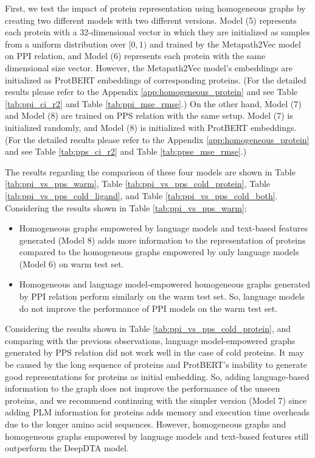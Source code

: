 First, we test the impact of protein representation using homogeneous graphs by creating two different models with two different versions. Model (5) represents each protein with a 32-dimensional vector in which they are initialized as samples from a uniform distribution over $[0, 1)$ and trained by the Metapath2Vec model on PPI relation, and Model (6) represents each protein with the same dimensional size vector. However, the Metapath2Vec model's embeddings are initialized as ProtBERT embeddings of corresponding proteins. (For the detailed results please refer to the Appendix \ref{app:homogeneous_protein} and see Table \ref{tab:ppi_ci_r2} and Table \ref{tab:ppi_mse_rmse}.) On the other hand, Model (7) and Model (8) are trained on PPS relation with the same setup. Model (7) is initialized randomly, and Model (8) is initialized with ProtBERT embeddings.(For the detailed results please refer to the Appendix \ref{app:homogeneous_protein} and see Table \ref{tab:pps_ci_r2} and Table \ref{tab:ppse_mse_rmse}.)


The results regarding the comparison of these four models are shown in Table \ref{tab:ppi_vs_pps_warm}, Table \ref{tab:ppi_vs_pps_cold_protein}, Table  \ref{tab:ppi_vs_pps_cold_ligand}, and Table \ref{tab:ppi_vs_pps_cold_both}. Considering the results shown in Table \ref{tab:ppi_vs_pps_warm};
\begin{itemize}
    \item Homogeneous graphs empowered by language models and text-based features generated (Model 8) adds more information to the representation of proteins compared to the homogeneous graphs empowered by only language models (Model 6) on warm test set. 
    \item Homogeneous and language model-empowered homogeneous graphs generated by PPI relation perform similarly on the warm test set. So, language models do not improve the performance of PPI models on the warm test set.  
\end{itemize}





\newpage
Considering the results shown in Table \ref{tab:ppi_vs_pps_cold_protein}, and comparing with the previous observations, language model-empowered graphs generated by PPS relation did not work well in the case of cold proteins. It may be caused by the long sequence of proteins and ProtBERT's inability to generate good representations for proteins as initial embedding. So, adding language-based information to the graph does not improve the performance of the unseen proteins, and we recommend continuing with the simpler version (Model 7) since adding PLM information for proteins adds memory and execution time overheads due to the longer amino acid sequences. However, homogeneous graphs and homogeneous graphs empowered by language models and text-based features still outperform the DeepDTA model.

